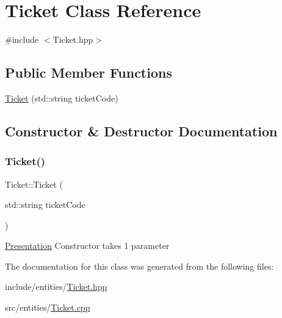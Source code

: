\hypertarget{class_ticket}{}\section{Ticket Class Reference}
\label{class_ticket}


{\ttfamily \#include $<$Ticket.\+hpp$>$}

\subsection*{Public Member Functions}
\begin{DoxyCompactItemize}
\item 
\mbox{\hyperlink{class_ticket_a84520fb1ab1eec222a6ad84df0ed0cfd}{Ticket}} (std\+::string ticket\+Code)
\end{DoxyCompactItemize}


\subsection{Constructor \& Destructor Documentation}
\mbox{\label{class_ticket_a84520fb1ab1eec222a6ad84df0ed0cfd}} 
\subsubsection{\texorpdfstring{Ticket()}{Ticket()}}
{\footnotesize\ttfamily Ticket\+::\+Ticket (\begin{DoxyParamCaption}\item[{std\+::string}]{ticket\+Code }\end{DoxyParamCaption})}

\mbox{\hyperlink{class_presentation}{Presentation}} Constructor takes 1 parameter 

The documentation for this class was generated from the following files\+:\begin{DoxyCompactItemize}
\item 
include/entities/\mbox{\hyperlink{_ticket_8hpp}{Ticket.\+hpp}}\item 
src/entities/\mbox{\hyperlink{_ticket_8cpp}{Ticket.\+cpp}}\end{DoxyCompactItemize}
